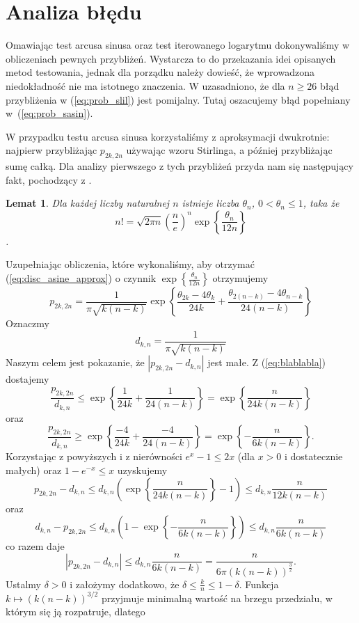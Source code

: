 \documentclass[a4paper,11pt,twoside]{book}
\newtheorem{lemat}[twier]{Lemat}
\theoremstyle{definition}
\begin{document}
\section{Analiza błędu}
Omawiając test arcusa sinusa oraz test iterowanego logarytmu dokonywaliśmy w obliczeniach pewnych przybliżeń. Wystarcza to do przekazania idei opisanych metod testowania, jednak dla porządku należy dowieść, że wprowadzona niedokładność nie ma istotnego znaczenia. W \cite{wang-nic} uzasadniono, że dla $n \geq 26$ błąd przybliżenia w (\ref{eq:prob_slil}) jest pomijalny. Tutaj oszacujemy błąd popełniany w~(\ref{eq:prob_sasin}).

W przypadku testu arcusa sinusa korzystaliśmy z aproksymacji dwukrotnie: najpierw przybliżając $p_{2k,2n}$ używając wzoru Stirlinga, a później przybliżając sumę całką. Dla analizy pierwszego z tych przybliżeń przyda nam się następujący fakt, pochodzący z \cite{leja}.
\begin{lemat}
 Dla każdej liczby naturalnej $n$ istnieje liczba $\theta_n$, $0 < \theta_n \leq 1$, taka że
 \[ n! = \sqrt{2\pi n} \left( \frac{n}{e} \right)^n \exp\left\{\frac{\theta_n}{12n}\right\} \].
\end{lemat}
Uzupełniając obliczenia, które wykonaliśmy, aby otrzymać (\ref{eq:disc_asine_approx}) o czynnik $\exp\left\{\frac{\theta_n}{12n}\right\}$ otrzymujemy
\begin{equation}
 \label{eq:blablabla}
 p_{2k,2n} = \frac{1}{\pi \sqrt{k(n-k)}} \exp\left\{ \frac{\theta_{2k} - 4\theta_k}{24k} + \frac{\theta_{2(n-k)} - 4\theta_{n-k}}{24(n-k)} \right\}
\end{equation}
Oznaczmy
\[ d_{k,n} = \frac{1}{\pi \sqrt{k(n-k)}} \]
Naszym celem jest pokazanie, że $|p_{2k,2n} - d_{k,n}|$ jest małe. Z (\ref{eq:blablabla}) dostajemy
\[ \frac{p_{2k,2n}}{d_{k,n}} \leq \exp\left\{ \frac{1}{24k} + \frac{1}{24(n-k)} \right\} = \exp\left\{ \frac{n}{24k(n-k)} \right\} \]
oraz
\[ \frac{p_{2k,2n}}{d_{k,n}} \geq \exp\left\{ \frac{-4}{24k} + \frac{-4}{24(n-k)} \right\} = \exp\left\{ -\frac{n}{6k(n-k)} \right\}. \]
Korzystając z powyższych i z nierówności $e^x - 1 \leq 2x$ (dla $x > 0$ i dostatecznie małych) oraz $1 - e^{-x} \leq x$ uzyskujemy
\[ p_{2k,2n} - d_{k,n} \leq d_{k,n} \left(\exp\left\{ \frac{n}{24k(n-k)} \right\} - 1\right) \leq d_{k,n}\frac{n}{12k(n-k)} \]
oraz 
\[ d_{k,n} - p_{2k,2n} \leq d_{k,n} \left( 1 -\exp\left\{ -\frac{n}{6k(n-k)} \right\} \right) \leq d_{k,n}\frac{n}{6k(n-k)} \]
co razem daje 
\[ |p_{2k,2n} - d_{k,n}| \leq  d_{k,n}\frac{n}{6k(n-k)} = \frac{n}{6\pi\left( k(n-k) \right)^{\frac{3}{2}}}. \]
Ustalmy $\delta > 0$ i założymy dodatkowo, że $\delta \leq \frac{k}{n} \leq 1 - \delta$. Funkcja $k \mapsto \left( k(n-k) \right)^{3/2}$ przyjmuje minimalną wartość na brzegu przedziału, w którym się ją rozpatruje, dlatego
\end{document}

